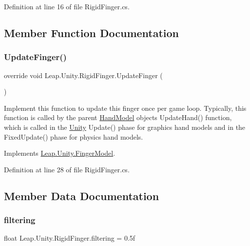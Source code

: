 Definition at line 16 of file Rigid\+Finger.\+cs.



\subsection{Member Function Documentation}
\mbox{\label{class_leap_1_1_unity_1_1_rigid_finger_a92ed755907bd1cc5213b6277d7e2227d}} 
\subsubsection{\texorpdfstring{UpdateFinger()}{UpdateFinger()}}
{\footnotesize\ttfamily override void Leap.\+Unity.\+Rigid\+Finger.\+Update\+Finger (\begin{DoxyParamCaption}{ }\end{DoxyParamCaption})\hspace{0.3cm}{\ttfamily [virtual]}}

Implement this function to update this finger once per game loop. Typically, this function is called by the parent \mbox{\hyperlink{class_leap_1_1_unity_1_1_hand_model}{Hand\+Model}} object\textquotesingle{}s Update\+Hand() function, which is called in the \mbox{\hyperlink{namespace_leap_1_1_unity}{Unity}} Update() phase for graphics hand models and in the Fixed\+Update() phase for physics hand models. 

Implements \mbox{\hyperlink{class_leap_1_1_unity_1_1_finger_model_a9103f063172a8f99a9aa083407ada2a2}{Leap.\+Unity.\+Finger\+Model}}.



Definition at line 28 of file Rigid\+Finger.\+cs.



\subsection{Member Data Documentation}
\mbox{\label{class_leap_1_1_unity_1_1_rigid_finger_a865ffa7886e7a6802ecf73210db91db4}} 
\subsubsection{\texorpdfstring{filtering}{filtering}}
{\footnotesize\ttfamily float Leap.\+Unity.\+Rigid\+Finger.\+filtering = 0.\+5f}




